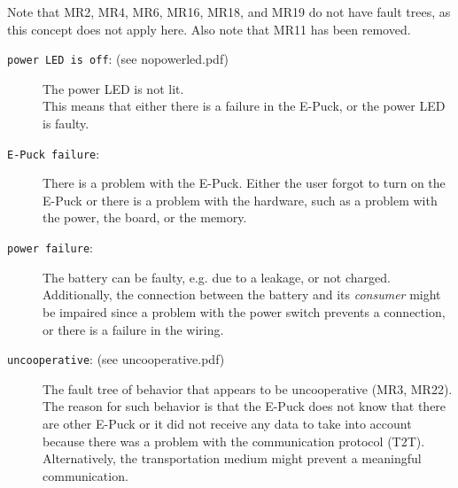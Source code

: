 \documentclass[a4paper,parskip,headheight=38pt]{scrartcl} %
\begin{document}
Note that MR2, MR4, MR6, MR16, MR18, and MR19 do
not have fault trees, as this concept does not apply here.  Also note
that MR11 has been removed.

\newcommand{\refpdf}[1]{(see \href{trees/#1.pdf}{\texttt{#1.pdf}})\\}

\begin{description}
\item[\texttt{power LED is off}: (see nopowerled.pdf)]
    The power LED is not lit. \\
    This means that either there is a failure in the E-Puck, or the power LED is faulty.
\item[\texttt{E-Puck failure}:]
    There is a problem with the E-Puck. 
    Either the user forgot to turn on the E-Puck or there is a problem with the hardware, such as a problem with the power, the board, or the memory.
\item[\texttt{power failure}:]
    The battery can be faulty, e.g. due to a leakage, or not charged. Additionally, the connection between the battery and its \textit{consumer} might be impaired since a problem with the power switch prevents a connection, or there is a failure in the wiring.
\item[\texttt{uncooperative}: (see uncooperative.pdf)]
    The fault tree of behavior that appears to be uncooperative (MR3, MR22). \\
    The reason for such behavior is that the E-Puck does not know that there are other E-Puck or it did not receive any data to take into account because there was a problem with the communication protocol (T2T). 
    Alternatively, the transportation medium might prevent a meaningful communication.


\end{description}
\end{document}
